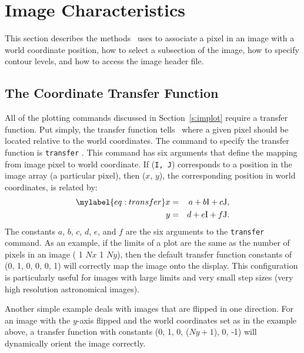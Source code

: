 \section		{Image Characteristics}

This section describes the methods \wip\ uses to associate a pixel
in an image with a world coordinate position, how to select a
subsection of the image, how to specify contour levels, and
how to access the image header file.

\subsection*		{The Coordinate Transfer Function}

All of the plotting commands discussed in Section~\ref{s:implot}
require a transfer function.
Put simply, the transfer function tells \wip\ where a given pixel should
be located relative to the
world coordinates.
The command to specify the transfer function is
{\tt transfer}%
.
This command has six arguments that define the mapping from image pixel
to world coordinate.
If ({\tt I, J}) corresponds to a position in the image array
(a particular pixel),
then ($x$, $y$), the corresponding position in world coordinates,
is related by:
\begin{eqnarray*}
\mylabel{eq:transfer}
  x & = & a + b \mbox{I} + c \mbox{J}, \\
  y & = & d + e \mbox{I} + f \mbox{J}.
\end{eqnarray*}
The constants $a$, $b$, $c$, $d$, $e$, and $f$
are the six arguments to the {\tt transfer} command.
As an example, if the limits of a plot
are the same as the number of pixels in an image
(%
1 $Nx$ 1 $Ny$),
then the default transfer function constants of (0, 1, 0, 0, 0, 1)
will correctly map the image onto the display.
This configuration is particularly useful for images with large limits
and very small step sizes (\eg very high resolution astronomical images).

Another simple example deals with images that are flipped in one
direction.
For an image with the $y$-axis flipped and the world coordinates set as
in the example above,
a transfer function with constants (0, 1, 0, ($Ny + 1$), 0, -1)
will dynamically orient the image correctly.

